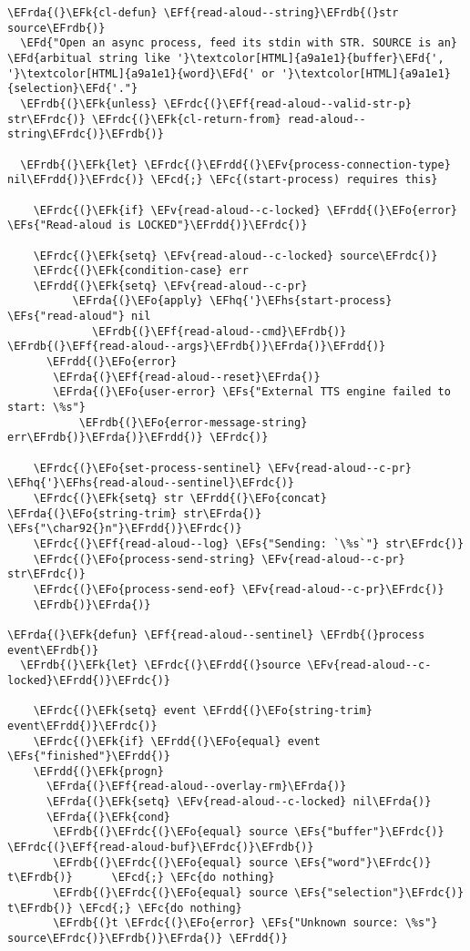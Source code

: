 \documentclass[a4wide,10pt]{article}
\newcommand{\EFc}[1]{\textcolor{EFc}{#1}} %
\newcommand{\EFcd}[1]{\textcolor{EFcd}{#1}} %
\newcommand{\EFs}[1]{\textcolor{EFs}{#1}} %
\newcommand{\EFd}[1]{\textcolor{EFd}{#1}} %
\newcommand{\EFk}[1]{\textcolor{EFk}{#1}} %
\newcommand{\EFf}[1]{\textcolor{EFf}{#1}} %
\newcommand{\EFv}[1]{\textcolor{EFv}{#1}} %
\newcommand{\EFo}[1]{\textcolor{EFo}{#1}} %
\newcommand{\EFhq}[1]{\textcolor{EFhq}{#1}} %
\newcommand{\EFhs}[1]{\textcolor{EFhs}{#1}} %
\newcommand{\EFrda}[1]{\textcolor{EFrda}{#1}} %
\newcommand{\EFrdb}[1]{\textcolor{EFrdb}{#1}} %
\newcommand{\EFrdc}[1]{\textcolor{EFrdc}{#1}} %
\newcommand{\EFrdd}[1]{\textcolor{EFrdd}{#1}} %
\begin{document}
\begin{Code}
\begin{Verbatim}
\EFrda{(}\EFk{cl-defun} \EFf{read-aloud--string}\EFrdb{(}str source\EFrdb{)}
  \EFd{"Open an async process, feed its stdin with STR. SOURCE is an}
\EFd{arbitual string like '}\textcolor[HTML]{a9a1e1}{buffer}\EFd{', '}\textcolor[HTML]{a9a1e1}{word}\EFd{' or '}\textcolor[HTML]{a9a1e1}{selection}\EFd{'."}
  \EFrdb{(}\EFk{unless} \EFrdc{(}\EFf{read-aloud--valid-str-p} str\EFrdc{)} \EFrdc{(}\EFk{cl-return-from} read-aloud--string\EFrdc{)}\EFrdb{)}

  \EFrdb{(}\EFk{let} \EFrdc{(}\EFrdd{(}\EFv{process-connection-type} nil\EFrdd{)}\EFrdc{)} \EFcd{;} \EFc{(start-process) requires this}

    \EFrdc{(}\EFk{if} \EFv{read-aloud--c-locked} \EFrdd{(}\EFo{error} \EFs{"Read-aloud is LOCKED"}\EFrdd{)}\EFrdc{)}

    \EFrdc{(}\EFk{setq} \EFv{read-aloud--c-locked} source\EFrdc{)}
    \EFrdc{(}\EFk{condition-case} err
	\EFrdd{(}\EFk{setq} \EFv{read-aloud--c-pr}
	      \EFrda{(}\EFo{apply} \EFhq{'}\EFhs{start-process} \EFs{"read-aloud"} nil
		     \EFrdb{(}\EFf{read-aloud--cmd}\EFrdb{)} \EFrdb{(}\EFf{read-aloud--args}\EFrdb{)}\EFrda{)}\EFrdd{)}
      \EFrdd{(}\EFo{error}
       \EFrda{(}\EFf{read-aloud--reset}\EFrda{)}
       \EFrda{(}\EFo{user-error} \EFs{"External TTS engine failed to start: \%s"}
		   \EFrdb{(}\EFo{error-message-string} err\EFrdb{)}\EFrda{)}\EFrdd{)} \EFrdc{)}

    \EFrdc{(}\EFo{set-process-sentinel} \EFv{read-aloud--c-pr} \EFhq{'}\EFhs{read-aloud--sentinel}\EFrdc{)}
    \EFrdc{(}\EFk{setq} str \EFrdd{(}\EFo{concat} \EFrda{(}\EFo{string-trim} str\EFrda{)} \EFs{"\char92{}n"}\EFrdd{)}\EFrdc{)}
    \EFrdc{(}\EFf{read-aloud--log} \EFs{"Sending: `\%s`"} str\EFrdc{)}
    \EFrdc{(}\EFo{process-send-string} \EFv{read-aloud--c-pr} str\EFrdc{)}
    \EFrdc{(}\EFo{process-send-eof} \EFv{read-aloud--c-pr}\EFrdc{)}
    \EFrdb{)}\EFrda{)}

\EFrda{(}\EFk{defun} \EFf{read-aloud--sentinel} \EFrdb{(}process event\EFrdb{)}
  \EFrdb{(}\EFk{let} \EFrdc{(}\EFrdd{(}source \EFv{read-aloud--c-locked}\EFrdd{)}\EFrdc{)}

    \EFrdc{(}\EFk{setq} event \EFrdd{(}\EFo{string-trim} event\EFrdd{)}\EFrdc{)}
    \EFrdc{(}\EFk{if} \EFrdd{(}\EFo{equal} event \EFs{"finished"}\EFrdd{)}
	\EFrdd{(}\EFk{progn}
	  \EFrda{(}\EFf{read-aloud--overlay-rm}\EFrda{)}
	  \EFrda{(}\EFk{setq} \EFv{read-aloud--c-locked} nil\EFrda{)}
	  \EFrda{(}\EFk{cond}
	   \EFrdb{(}\EFrdc{(}\EFo{equal} source \EFs{"buffer"}\EFrdc{)} \EFrdc{(}\EFf{read-aloud-buf}\EFrdc{)}\EFrdb{)}
	   \EFrdb{(}\EFrdc{(}\EFo{equal} source \EFs{"word"}\EFrdc{)} t\EFrdb{)}	  \EFcd{;} \EFc{do nothing}
	   \EFrdb{(}\EFrdc{(}\EFo{equal} source \EFs{"selection"}\EFrdc{)} t\EFrdb{)} \EFcd{;} \EFc{do nothing}
	   \EFrdb{(}t \EFrdc{(}\EFo{error} \EFs{"Unknown source: \%s"} source\EFrdc{)}\EFrdb{)}\EFrda{)} \EFrdd{)}


\end{Verbatim}
\end{Code}
\end{document}

